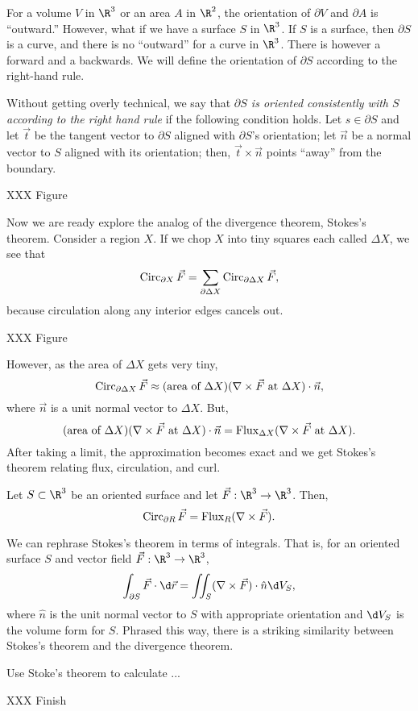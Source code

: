 For a volume $V$ in $\R^3$ or an area $A$ in $\R^2$, the orientation
of $\partial V$ and $\partial A$ is ``outward.''  However, what if we have
a surface $S$ in $\R^3$.  If $S$ is a surface, then $\partial S$ is
a curve, and there is no ``outward'' for a curve in $\R^3$.  There is
however a forward and a backwards.  We will define the orientation
of $\partial S$ according to the right-hand rule.

Without getting overly technical, we say that \emph{$\partial S$ is oriented
consistently with $S$ according to the right hand rule} if the following condition
holds.  Let $s\in\partial S$ and let $\vec t$ be the tangent vector to $\partial S$
aligned with $\partial S$'s orientation; let $\vec n$ be a normal vector to $S$ aligned
with its orientation; then, $\vec t\times \vec n$ points ``away'' from the boundary.

XXX Figure


Now we are ready explore the analog of the divergence theorem, Stokes's theorem.
Consider a region $X$.  If
we chop $X$ into tiny squares each called $\Delta X$, we see that
\[
	\operatorname{Circ}_{\partial X} \vec F = \sum_{\partial \Delta X} \operatorname{Circ}_{\partial \Delta X} \vec F,
\]
because circulation along any interior edges cancels out.

XXX Figure

However, as the area of $\Delta X$ gets very tiny,
\[
	\operatorname{Circ}_{\partial \Delta X} \vec F \approx (\text{area of }\Delta X)(\nabla \times \vec F
	\text{ at }\Delta X)\cdot \vec n,
\]
where $\vec n$ is a unit normal vector to $\Delta X$.  But, 
\[ 
	(\text{area of }\Delta X)(\nabla \times \vec F
	\text{ at }\Delta X)\cdot \vec n = \operatorname{Flux}_{\Delta X}(\nabla \times \vec F\text{ at }\Delta X).
\]
After taking a limit, the approximation becomes exact and we get Stokes's theorem
relating flux, circulation, and curl.

\begin{theorem}
	Let $S\subset \R^3$ be an oriented surface and let $\vec F:\R^3\to\R^3$.  Then,
	\[
		\operatorname{Circ}_{\partial R} \vec F = \operatorname{Flux}_{R}(\nabla \times \vec F).
	\]
\end{theorem}

We can rephrase Stokes's theorem in terms of integrals.  That is, for an oriented
surface $S$ and vector field $\vec F:\R^3\to\R^3$,
\[
	\int_{\partial S} \vec F\cdot \d\vec r = \iint_S (\nabla \times \vec F)\cdot
	\hat n\d V_S,
\]
where $\hat n$ is the unit normal vector to $S$ with appropriate orientation and 
$\d V_S$ is the volume form for $S$.  Phrased this way, there is a striking similarity
between Stokes's theorem and the divergence theorem.

\begin{example}
	Use Stoke's theorem to calculate ...

	XXX Finish
\end{example}




